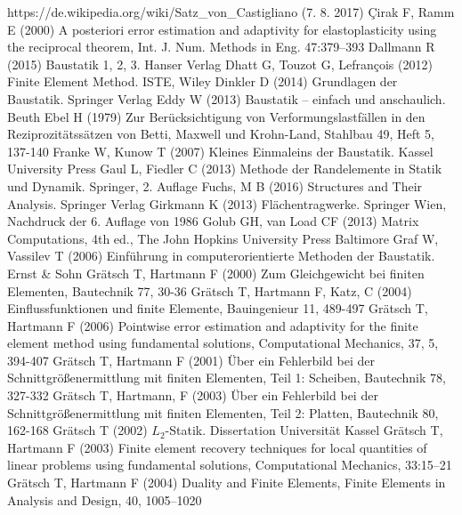 \begin{thebibliography}{}
 https://de.wikipedia.org/wiki/Satz\_von\_Castigliano (7. 8. 2017)
 \c{C}irak F, Ramm E (2000) \lqq A posteriori error estimation and adaptivity for elastoplasticity using the reciprocal theorem\rqq, Int. J. Num. Methods in Eng.  47:379--393
 Dallmann R (2015) Baustatik 1, 2, 3. Hanser Verlag
 Dhatt G, Touzot G, Lefran\c{c}ois (2012) Finite Element Method. ISTE, Wiley
 Dinkler D (2014) Grundlagen der Baustatik. Springer Verlag
 Eddy W (2013) Baustatik -- einfach und anschaulich. Beuth
 Ebel H (1979) \lqq Zur Ber\"{u}cksichtigung von Verformungslastf\"{a}llen in den Reziprozit\"{a}tss\"{a}tzen von Betti, Maxwell und Krohn-Land\rqq, Stahlbau 49, Heft 5, 137-140
 Franke W, Kunow T (2007) Kleines Einmaleins der Baustatik. Kassel University Press
 Gaul L, Fiedler C (2013) Methode der Randelemente in Statik und Dynamik. Springer, 2. Auflage
 Fuchs, M B (2016) Structures and Their Analysis. Springer Verlag
     Girkmann K (2013) Fl\"{a}chentragwerke. Springer Wien, Nachdruck der 6. Auflage von 1986
 Golub GH, van Load CF (2013) Matrix Computations, 4th ed., The John Hopkins University Press Baltimore
 Graf W, Vassilev T (2006) Einf\"{u}hrung in computerorientierte Methoden der Baustatik. Ernst \& Sohn
 Gr\"{a}tsch T, Hartmann F (2000) \lqq Zum Gleichgewicht bei finiten Elementen\rqq, Bautechnik 77, 30-36
 Gr\"{a}tsch T, Hartmann F, Katz, C (2004) \lqq Einflussfunktionen und finite Elemente\rqq, Bauingenieur 11, 489-497
 Gr\"{a}tsch T, Hartmann F (2006) \lqq Pointwise error estimation and adaptivity for the finite element method using fundamental solutions\rqq, Computational Mechanics, 37, 5, 394-407
 Gr\"{a}tsch T, Hartmann F (2001) \lqq \"{U}ber ein Fehlerbild bei der Schnittgr\"{o}{\ss}enermittlung mit finiten Elementen, Teil 1: Scheiben\rqq, Bautechnik 78, 327-332
 Gr\"{a}tsch T, Hartmann, F (2003) \lqq \"{U}ber ein Fehlerbild bei der Schnittgr\"{o}{\ss}enermittlung mit finiten Elementen, Teil 2: Platten\rqq, Bautechnik 80, 162-168
 Gr\"{a}tsch T (2002) $L_2$-Statik. Dissertation Universit\"{a}t Kassel
 Gr\"{a}tsch T, Hartmann F (2003) \lqq Finite element recovery techniques for local quantities of linear problems using fundamental solutions\rqq, Computational Mechanics, 33:15--21
 Gr\"{a}tsch T, Hartmann F (2004) \lqq Duality and Finite Elements\rqq, Finite Elements in Analysis and Design, 40, 1005--1020

\end{thebibliography}
